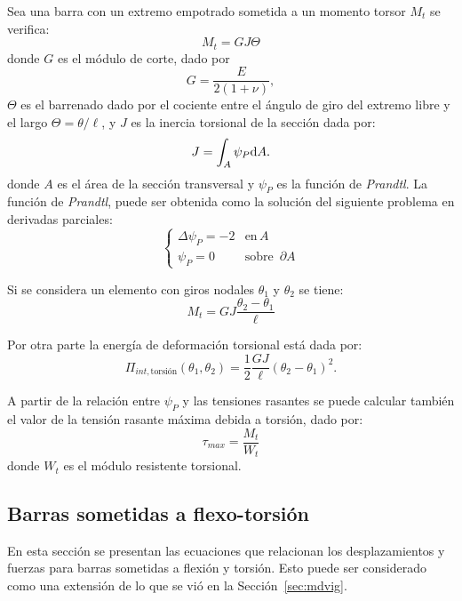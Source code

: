 Sea una barra con un extremo empotrado sometida a un momento torsor $M_t$ se verifica:
%
\begin{equation}
M_t = G J \Theta
\end{equation}
donde $G$ es el módulo de corte, dado por
\begin{equation}
G=\frac{E}{2(1+\nu)},
\end{equation}
$\Theta$ es el barrenado dado por el cociente entre el ángulo de giro del extremo libre y el largo  $\Theta = \theta / \ell$, y $J$ es la inercia torsional de la sección dada por:
%
\begin{equation}
J = \int_{A} \psi_P {\text{d}} A.
\end{equation}
%
donde $A$ es el área de la sección transversal y $\psi_P$ es la función de \emph{Prandtl}. %
%
La función de \emph{Prandtl}, puede ser obtenida como la solución del siguiente problema en derivadas parciales:
%
\begin{equation}
\left\{
\begin{array}{lr}
\Delta \psi_P = -2 & \text{en} \, A\\
\psi_P = 0 & \text{sobre } \, \partial A
\end{array}
\right.
\end{equation} 
%

Si se considera un elemento con giros nodales $\theta_1$ y $\theta_2$ se tiene:
%
\begin{equation}
  M_t = G J \frac{\theta_2 - \theta_1}{\ell}
\end{equation}

Por otra parte la energía de deformación torsional está dada por:
%
\begin{equation}
\Pi_{int,\text{torsión}}(\theta_1,\theta_2) = \frac{1}{2} \frac{G J}{\ell} \left( \theta_2 - \theta_1\right)^2.
\end{equation}
%

A partir de la relación entre $\psi_P$ y las tensiones rasantes se puede calcular también el valor de la tensión rasante máxima debida a torsión, dado por:
%
\begin{equation}
\tau_{max} = \frac{M_t}{W_t}
\end{equation}
%
donde $W_t$ es el módulo resistente torsional.


\subsection{Barras sometidas a flexo-torsión}
%
En esta sección se presentan las ecuaciones que relacionan los desplazamientos y fuerzas para barras sometidas a flexión y torsión. %
%
Esto puede ser considerado como una extensión de lo que se vió en la Sección~\ref{sec:mdvig}. %

